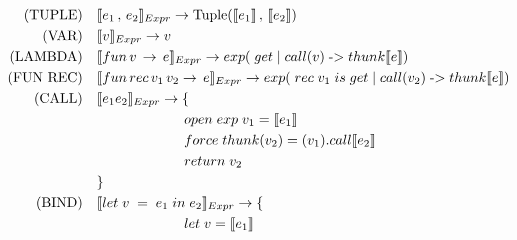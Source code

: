 \documentclass[
  12pt,
]{article}
\begin{document}
\begin{align*}
  \text{(TUPLE)} \quad     & \translateNode{e_1 \, , \, e_2}{Expr} \rightarrow \text{Tuple}(\translateResult{e_1} \, , \, \translateResult{e_2})                                                          \\
  \text{(VAR)} \quad       & \translateNode{v}{Expr} \rightarrow v                                                                                                                                          \\
  \text{(LAMBDA)} \quad    & \translateNode{fun \, v \, \rightarrow \, e}{Expr}    \rightarrow  exp(  \; get \; | \; call(v) \; \text{->}  \; thunk\translateResult{e}  )                                   \\
  \text{(FUN REC)} \quad   & \translateNode{fun \, rec \, v_1 \, v_2 \rightarrow \, e}{Expr}      \rightarrow exp( \; rec \; v_1 \; is \; get \; | \; call(v_2) \; \text{->}  \; thunk\translateResult{e} ) \\
  \text{(CALL)} \quad      & \translateNode{e_1 e_2}{Expr}     \rightarrow  \{                                                                                                                              \\
                           & \Tab open \; exp \; v_1  = \translateResult{e_1}                                                                                                                               \\
                           & \Tab force \; thunk(v_2) = (v_1).call\translateResult{e_2}                                                                                                                     \\
                           & \Tab return \; v_2                                                                                                                                                             \\
                           & \}                                                                                                                                                                             \\
  \text{(BIND)} \quad      & \translateNode{let \; v \; = \; e_1 \; in \; e_2}{Expr}  \rightarrow  \{                                                                                                       \\
                           & \Tab let \; v = \translateResult{e_1}                                                                                                                                          \\

\end{align*}
\end{document}
